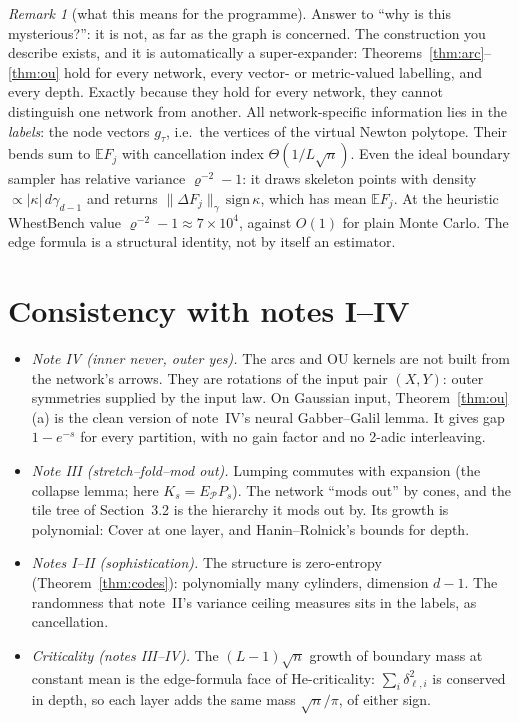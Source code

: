 \documentclass[11pt]{article}
\theoremstyle{definition}
\theoremstyle{remark}
\newtheorem{remark}[theorem]{Remark}
\newcommand{\E}{\mathbb E}
\begin{document}
\begin{remark}[what this means for the programme]
Answer to ``why is this mysterious?'': it is not, as far as the graph is concerned. The construction you describe exists, and it is automatically a super-expander: Theorems~\ref{thm:arc}--\ref{thm:ou} hold for every network, every vector- or metric-valued labelling, and every depth. Exactly because they hold for every network, they cannot distinguish one network from another. All network-specific information lies in the \emph{labels}: the node vectors $g_\tau$, i.e.\ the vertices of the virtual Newton polytope. Their bends sum to $\E F_j$ with cancellation index $\Theta(1/L\sqrt n)$. Even the ideal boundary sampler has relative variance $\varrho^{-2}-1$: it draws skeleton points with density $\propto|\kappa|\,d\gamma_{d-1}$ and returns $\|\Delta F_j\|_\gamma\,\mathrm{sign}\,\kappa$, which has mean $\E F_j$. At the heuristic WhestBench value $\varrho^{-2}-1\approx7\times10^4$, against $O(1)$ for plain Monte Carlo. The edge formula is a structural identity, not by itself an estimator.
\end{remark}

\section{Consistency with notes I--IV}

\begin{itemize}
\item \emph{Note IV (inner never, outer yes).} The arcs and OU kernels are not built from the network's arrows. They are rotations of the input pair $(X,Y)$: outer symmetries supplied by the input law. On Gaussian input, Theorem~\ref{thm:ou}(a) is the clean version of note~IV's neural Gabber--Galil lemma. It gives gap $1-e^{-s}$ for every partition, with no gain factor and no 2-adic interleaving.
\item \emph{Note III (stretch--fold--mod out).} Lumping commutes with expansion (the collapse lemma; here $K_s=E_{\mathcal P}P_s$). The network ``mods out'' by cones, and the tile tree of Section~3.2 is the hierarchy it mods out by. Its growth is polynomial: Cover at one layer, and Hanin--Rolnick's bounds for depth.
\item \emph{Notes I--II (sophistication).} The structure is zero-entropy (Theorem~\ref{thm:codes}): polynomially many cylinders, dimension $d-1$. The randomness that note~II's variance ceiling measures sits in the labels, as cancellation.
\item \emph{Criticality (notes III--IV).} The $(L-1)\sqrt n$ growth of boundary mass at constant mean is the edge-formula face of He-criticality: $\sum_i\delta_{\ell,i}^2$ is conserved in depth, so each layer adds the same mass $\sqrt n/\pi$, of either sign.
\end{itemize}
\end{document}
